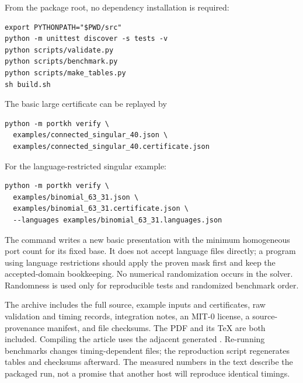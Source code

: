 \documentclass[11pt,letterpaper]{article}
\newcommand{\code}[1]{\texttt{\detokenize{#1}}}
\theoremstyle{definition}
\theoremstyle{remark}
\numberwithin{equation}{section}
\begin{document}
From the package root, no dependency installation is required:
\begin{verbatim}
export PYTHONPATH="$PWD/src"
python -m unittest discover -s tests -v
python scripts/validate.py
python scripts/benchmark.py
python scripts/make_tables.py
sh build.sh
\end{verbatim}
The basic large certificate can be replayed by
\begin{verbatim}
python -m portkh verify \
  examples/connected_singular_40.json \
  examples/connected_singular_40.certificate.json
\end{verbatim}
For the language-restricted singular example:
\begin{verbatim}
python -m portkh verify \
  examples/binomial_63_31.json \
  examples/binomial_63_31.certificate.json \
  --languages examples/binomial_63_31.languages.json
\end{verbatim}
The \code{minimize} command writes a new basic presentation with the
minimum homogeneous port count for its fixed base. It does not accept
language files directly; a program using language restrictions should
apply the proven mask first and keep the accepted-domain bookkeeping.
No numerical randomization occurs in the solver. Randomness is used only
for reproducible tests and randomized benchmark order.

The archive includes the full source, example inputs and certificates,
raw validation and timing records, integration notes, an MIT-0 license,
a source-provenance manifest, and file checksums. The PDF and its TeX are
both included. Compiling the article uses the adjacent generated
\code{measurements.tex}. Re-running benchmarks changes timing-dependent
files; the reproduction script regenerates tables and checksums afterward.
The measured numbers in the text describe the packaged run, not a promise
that another host will reproduce identical timings.
\end{document}
